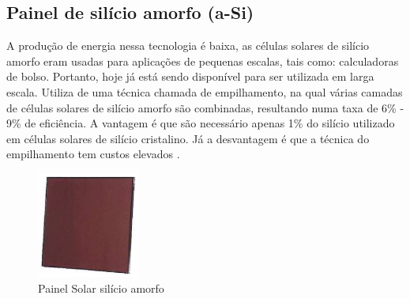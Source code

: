 \subsection{Painel de silício amorfo (a-Si)}

A produção de energia nessa tecnologia é baixa, as células solares de silício amorfo eram usadas para aplicações de pequenas escalas, tais como: calculadoras de bolso. Portanto, hoje já está sendo disponível para ser utilizada em larga escala.  Utiliza de uma técnica chamada de empilhamento, na qual várias camadas de células solares de silício amorfo são combinadas, resultando numa taxa de 6\% - 9\% de eficiência. A vantagem é que são necessário apenas 1\% do silício utilizado em células solares de silício cristalino. Já a desvantagem é que a técnica do empilhamento tem custos elevados \cite{neosolar}.

\begin{figure}[!h]
\centering
\includegraphics[width=0.3\textwidth]{figuras/marrom.png}
\caption{Painel Solar silício amorfo}
\label{fig:marrom}
\end{figure}